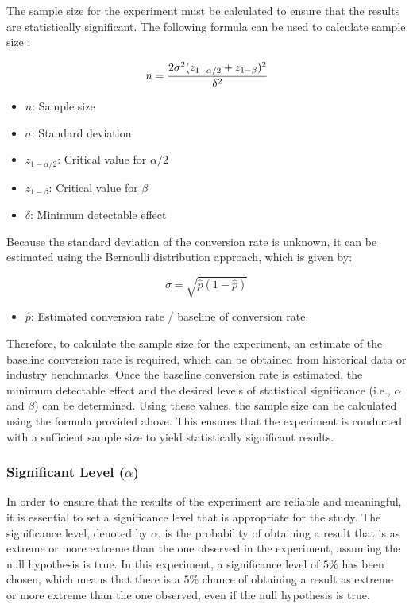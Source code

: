 \documentclass{article}
\begin{document}
The sample size for the experiment must be calculated to ensure that the results are statistically significant. The following formula can be used to calculate sample size \cite{kohavi_tang_xu_2020}:

$$
n = \cfrac{2 \sigma^2 (z_{1-\alpha/2}+z_{1-\beta})^2}{\delta^2}
$$

\begin{itemize}
    \item $n$: Sample size
    \item $\sigma$: Standard deviation
    \item $z_{1-\alpha/2}$: Critical value for $\alpha/2$
    \item $z_{1-\beta}$: Critical value for $\beta$
    \item $\delta$: Minimum detectable effect
\end{itemize}

Because the standard deviation of the conversion rate is unknown, it can be estimated using the Bernoulli distribution approach, which is given by:

$$\sigma=\sqrt{\hat{p}(1-\hat{p})}$$

\begin{itemize}
    \item $\hat{p}$: Estimated conversion rate / baseline of conversion rate.
\end{itemize}

Therefore, to calculate the sample size for the experiment, an estimate of the baseline conversion rate is required, which can be obtained from historical data or industry benchmarks. Once the baseline conversion rate is estimated, the minimum detectable effect and the desired levels of statistical significance (i.e., $\alpha$ and $\beta$) can be determined. Using these values, the sample size can be calculated using the formula provided above. This ensures that the experiment is conducted with a sufficient sample size to yield statistically significant results.

\subsubsection*{Significant Level ($\alpha$)} \par

In order to ensure that the results of the experiment are reliable and meaningful, it is essential to set a significance level that is appropriate for the study. The significance level, denoted by $\alpha$, is the probability of obtaining a result that is as extreme or more extreme than the one observed in the experiment, assuming the null hypothesis is true. In this experiment, a significance level of $5\%$ has been chosen, which means that there is a $5\%$ chance of obtaining a result as extreme or more extreme than the one observed, even if the null hypothesis is true.
\end{document}
